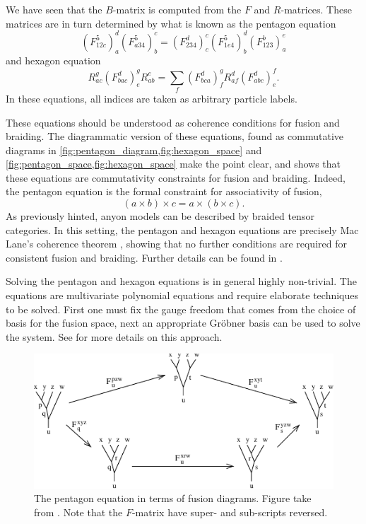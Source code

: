 \documentclass[a4paper,10pt,oneside]{book}
\theoremstyle{plain}
\theoremstyle{definition}
\theoremstyle{remark}
\begin{document}
We have seen that the $B$-matrix is computed from the $F$ and $R$-matrices. These matrices are in turn determined by what is known as the pentagon equation
\begin{equation}\label{eq:pentagon}
  \left(F_{12c}^5\right)^d_a \left(F_{a34}^5\right)^c_b = \left(F_{234}^d\right)_c^c \left( F_{1e4}^5 \right)^d_b \left( F_{123}^b \right)^e_a
\end{equation}
and hexagon equation
\begin{equation}\label{eq:hexagon}
  R_{ac}^g \left(F_{bac}^d\right)^g_e R_{ab}^e = \sum_{f} \left(F_{bca}^d\right)^g_f R_{af}^d \left(F_{abc}^d\right)^f_e.
\end{equation}
In these equations, all indices are taken as arbitrary particle labels.

These equations should be understood as coherence conditions for fusion and braiding. The diagrammatic version of these equations, found as commutative diagrams in \cref{fig:pentagon_diagram,fig:hexagon_space} and \cref{fig:pentagon_space,fig:hexagon_space} make the point clear, and shows that these equations are commutativity constraints for fusion and braiding. Indeed, the pentagon equation is the formal constraint for associativity of fusion,
\begin{equation}
  (a \times b) \times c = a \times (b \times c).
\end{equation}
As previously hinted, anyon models can be described by braided tensor categories. In this setting, the pentagon and hexagon equations are precisely Mac Lane's coherence theorem \cite{mac lane}, showing that no further conditions are required for consistent fusion and braiding. Further details can be found in \cite{kitaev,preskill}.

Solving the pentagon and hexagon equations is in general highly non-trivial. The equations are multivariate polynomial equations and require elaborate techniques to be solved. First one must fix the gauge freedom that comes from the choice of basis for the fusion space, next an appropriate Gröbner basis can be used to solve the system. See \cite{bonderson} for more details on this approach.

\begin{figure}[!htb]
  \centering
  \includegraphics[width=1\linewidth]{img/pentagon_diagram.pdf}
  \caption{The pentagon equation in terms of fusion diagrams. Figure take from \cite{kitaev}. Note that the $F$-matrix have super- and sub-scripts reversed.}
  \label{fig:pentagon_diagram}
\end{figure}
\end{document}
